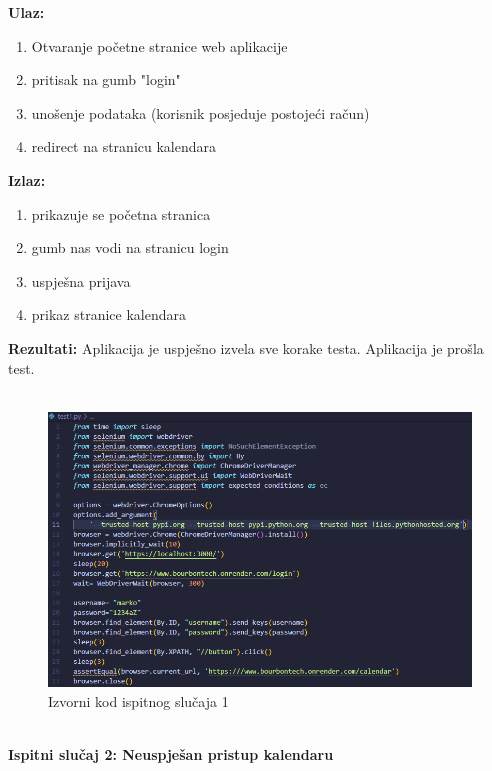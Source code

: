 				\textbf{Ulaz:}
				\begin{enumerate}
					\item Otvaranje početne stranice web aplikacije
					\item pritisak na gumb "login"
					\item unošenje podataka (korisnik posjeduje postojeći račun)
					\item redirect na stranicu kalendara
				\end{enumerate}
				\textbf{Izlaz:}
				\begin{enumerate}
					\item prikazuje se početna stranica
					\item gumb nas vodi na stranicu login
					\item uspješna prijava
					\item prikaz stranice kalendara
				\end{enumerate}
				\textbf{Rezultati:} {Aplikacija je uspješno izvela sve korake testa. \color{green} Aplikacija je prošla test.}\\\\
				
				
					\begin{figure}[H]
					\includegraphics[scale=0.4]{dijagrami/test1.png} %
					\centering
					\caption{Izvorni kod ispitnog slučaja 1}
					\label{fig:ispitnislucaj1}
				\end{figure}\\
				
				
					\textbf{Ispitni slučaj 2: Neuspješan pristup kalendaru}
				

